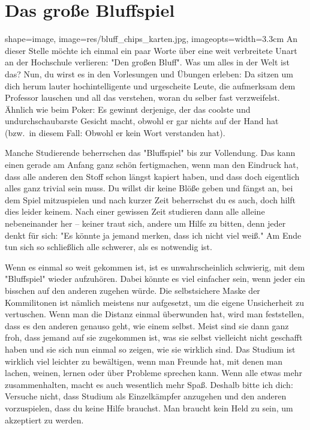 
\section{Das große Bluffspiel}
\begin{pullquote}{shape=image, image=res/bluff_chips_karten.jpg, imageopts={width=3.3cm}}
An dieser Stelle möchte ich einmal ein paar Worte über eine weit verbreitete Unart an der Hochschule verlieren: "Den großen Bluff". Was um alles in der Welt ist das? Nun, du wirst es in den Vorlesungen und Übungen erleben: Da sitzen um dich herum lauter hochintelligente und urgescheite Leute, die aufmerksam dem Professor lauschen und all das verstehen, woran du selber fast verzweifelst. Ähnlich wie beim Poker: Es gewinnt derjenige, der das coolste und undurchschaubarste Gesicht macht, obwohl er gar nichts auf der Hand hat (bzw.\ in diesem Fall: Obwohl er kein Wort verstanden hat).\pullquotenl

Manche Studierende beherrschen das "Bluffspiel" bis zur Vollendung. Das kann einen gerade am Anfang ganz schön fertigmachen, wenn man den Eindruck hat, dass alle anderen den Stoff schon längst kapiert haben, und dass doch eigentlich alles ganz trivial sein muss. Du willst dir keine Blöße geben und fängst an, bei dem Spiel mitzuspielen und nach kurzer Zeit beherrschst du es auch, doch hilft dies leider keinem. Nach einer gewissen Zeit studieren dann alle alleine nebeneinander her -- keiner traut sich, andere um Hilfe zu bitten, denn jeder denkt für sich: "Es könnte ja jemand merken, dass ich nicht viel weiß." Am Ende tun sich so schließlich alle schwerer, als es notwendig ist.\pullquotenl

Wenn es einmal so weit gekommen ist, ist es unwahrscheinlich schwierig, mit dem "Bluffspiel" wieder aufzuhören. Dabei könnte es viel einfacher sein, wenn jeder ein bisschen auf den anderen zugehen würde. Die selbstsichere Maske der Kommilitonen ist nämlich meistens nur aufgesetzt, um die eigene Unsicherheit zu vertuschen. Wenn man die Distanz einmal überwunden hat, wird man feststellen, dass es den anderen genauso geht, wie einem selbst. Meist sind sie dann ganz froh, dass jemand auf sie zugekommen ist, was sie selbst vielleicht nicht geschafft haben und sie sich nun einmal so zeigen, wie sie wirklich sind. Das Studium ist wirklich viel leichter zu bewältigen, wenn man Freunde hat, mit denen man lachen, weinen, lernen oder über Probleme sprechen kann. Wenn alle etwas mehr zusammenhalten, macht es auch wesentlich mehr Spaß. Deshalb bitte ich dich: Versuche nicht, dass Studium als Einzelkämpfer anzugehen und den anderen vorzuspielen, dass du keine Hilfe brauchst. Man braucht kein Held zu sein, um akzeptiert zu werden.

\end{pullquote}
